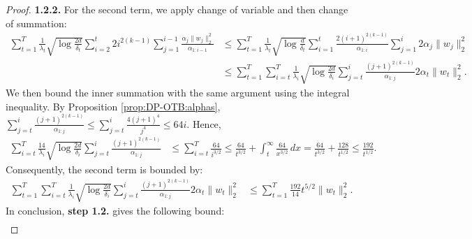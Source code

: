 \begin{proof}
\textbf{1.2.2.} For the second term, we apply change of variable and then change of summation:
\begin{align*}
    \sum_{t=1}^T \frac{1}{\lambda_t}\sqrt{\log \frac{2d}{\delta_t}} \sum_{i=2}^t 2i^{2(k-1)}\sum_{j=1}^{i-1} \frac{\alpha_j\|w_j\|_2^2}{\alpha_{1:i-1}} 
    &\leq \sum_{t=1}^T \frac{1}{\lambda_t}\sqrt{\log \frac{d}{\delta_t}} \sum_{i=1}^{t} \frac{2(i+1)^{2(k-1)}}{\alpha_{1:i}}\sum_{j=1}^{i}2\alpha_j\|w_j\|_2^2\\
    &\leq \sum_{t=1}^T\sum_{i=t}^T\frac{1}{\lambda_i}\sqrt{\log\frac{2d}{\delta_i}}\sum_{j=t}^i\frac{(j+1)^{2(k-1)}}{\alpha_{1:j}} 2\alpha_t\|w_t\|_2^2.
\end{align*}
We then bound the inner summation with the same argument using the integral inequality. By Proposition \ref{prop:DP-OTB:alphas}, $\sum_{j=t}^i\frac{(j+1)^{2(k-1)}}{\alpha_{1:j}}\leq \sum_{j=t}^i\frac{4(j+1)^4}{j^4} \leq 64i$. Hence,
\begin{align*}
    \sum_{i=t}^T\frac{14}{\lambda_i}\sqrt{\log\frac{2d}{\delta_i}}\sum_{j=t}^i\frac{(j+1)^{2(k-1)}}{\alpha_{1:j}}
    &\leq \sum_{i=t}^T \frac{64}{i^{3/2}} \leq \frac{64}{t^{3/2}}+\int_t^\infty \frac{64}{x^{3/2}}\,dx = \frac{64}{t^{3/2}} + \frac{128}{t^{1/2}} \leq \frac{192}{t^{1/2}}.
\end{align*}
Consequently, the second term is bounded by:
\begin{align*}
    \sum_{t=1}^T\sum_{i=t}^T\frac{1}{\lambda_i}\sqrt{\log\frac{2d}{\delta_i}}\sum_{j=t}^i\frac{(j+1)^{2(k-1)}}{\alpha_{1:j}} 2\alpha_t\|w_t\|_2^2
    &\leq \sum_{t=1}^T \frac{192}{14}t^{5/2}\|w_t\|_2^2.
\end{align*}
In conclusion, \textbf{step 1.2.} gives the following bound:
\begin{align*}

\end{align*}
\end{proof}
